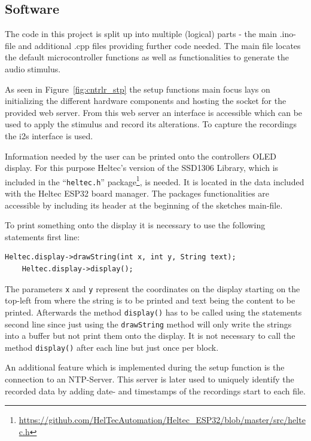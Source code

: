 \subsection{Software}
The code in this project is split up into multiple (logical) parts - the main .ino-file and additional .cpp files providing further code needed.
The main file locates the default microcontroller functions as well as functionalities to generate the audio stimulus.

As seen in Figure~\ref{fig:cntrlr_stp} the setup functions main focus lays on initializing the different hardware components and hosting the socket for the provided web server.
From this web server an interface is accessible which can be used to apply the stimulus and record its alterations.
To capture the recordings the i2s interface is used.

Information needed by the user can be printed onto the controllers OLED display.
For this purpose Heltec's version of the SSD1306 Library, which is included in the \enquote{\texttt{heltec.h}} package\footnote{\url{https://github.com/HelTecAutomation/Heltec_ESP32/blob/master/src/heltec.h}}, is needed.
It is located in the data included with the Heltec ESP32 board manager.
The packages functionalities are accessible by including its header at the beginning of the sketches main-file.

To print something onto the display it is necessary to use the following statements first line:
\begin{lstlisting}[style=inText]
	Heltec.display->drawString(int x, int y, String text);
	Heltec.display->display();
\end{lstlisting}
The parameters \texttt{x} and \texttt{y} represent the coordinates on the display starting on the top-left from where the string is to be printed and text being the content to be printed.
Afterwards the method \texttt{display()} has to be called using the  statements second line since just using the \texttt{drawString} method will only write the strings into a buffer but not print them onto the
display.
It is not necessary to call the method \texttt{display()} after each line but just once per block.

An additional feature which is implemented during the setup function is the connection to an NTP-Server.
This server is later used to uniquely identify the recorded data by adding date- and timestamps of the recordings start to each file.

